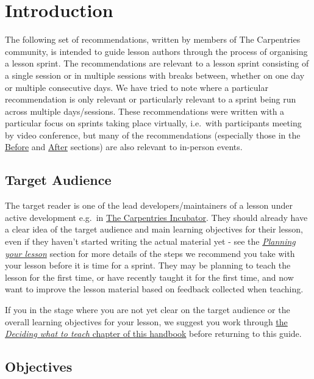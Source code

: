 \documentclass[
]{book}
\begin{document}
\hypertarget{introduction}{%
\section{Introduction}\label{introduction}}

The following set of recommendations,
written by members of The Carpentries community,
is intended to guide lesson authors through the process of
organising a lesson sprint.
The recommendations are relevant to a lesson sprint consisting of a single session
or in multiple sessions with breaks between,
whether on one day or multiple consecutive days.
We have tried to note where a particular recommendation is only relevant or
particularly relevant to a sprint being run across multiple days/sessions.
These recommendations were written with a particular focus on sprints taking place
virtually, i.e.~with participants meeting by video conference,
but many of the recommendations
(especially those in the \protect\hyperlink{before-the-sprint}{Before}
and \protect\hyperlink{after-the-sprint}{After} sections)
are also relevant to in-person events.

\hypertarget{target-audience-1}{%
\subsection{Target Audience}\label{target-audience-1}}

The target reader is one of the lead developers/maintainers of a lesson under active development
e.g.~in \href{https://github.com/carpentries-incubator/}{The Carpentries Incubator}.
They should already have a clear idea of the target audience and main learning objectives for their lesson,
even if they haven't started writing the actual material yet -
see the \protect\hyperlink{lesson-planning}{\emph{Planning your lesson}} section for more details
of the steps we recommend you take with your lesson before it is time for a sprint.
They may be planning to teach the lesson for the first time,
or have recently taught it for the first time,
and now want to improve the lesson material based on feedback collected when teaching.

If you in the stage where you are not yet clear on the target audience or the overall learning objectives for your lesson, we suggest you work through \href{https://cdh.carpentries.org/deciding-what-to-teach.html}{the \emph{Deciding what to teach} chapter of this handbook} before returning to this guide.

\hypertarget{objectives}{%
\subsection{Objectives}\label{objectives}}
\end{document}
